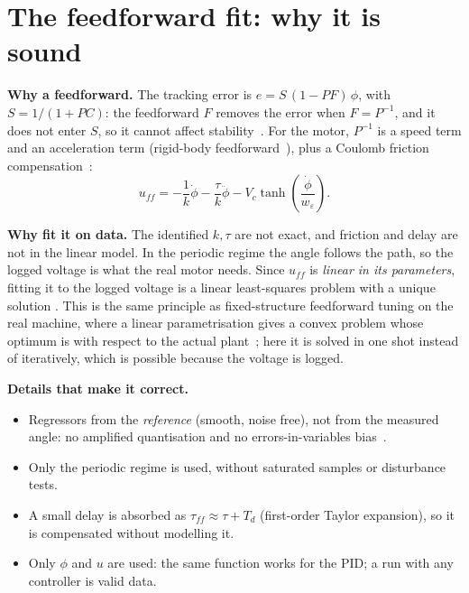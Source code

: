\documentclass[10pt,a4paper]{article}
\begin{document}
\section{The feedforward fit: why it is sound}

\textbf{Why a feedforward.} The tracking error is $e=S\,(1-PF)\,\phi$, with $S=1/(1+PC)$: the feedforward $F$ removes the error
when $F=P^{-1}$, and it does not enter $S$, so it cannot affect stability~\cite{lambrechts05,boerlage03}. For the motor,
$P^{-1}$ is a speed term and an acceleration term (rigid-body feedforward~\cite{lambrechts05}), plus a Coulomb friction
compensation~\cite{armstrong94}:
\begin{equation}
  u_{ff}=-\frac{1}{k}\dot\phi-\frac{\tau}{k}\ddot\phi-V_c\tanh\!\left(\frac{\dot\phi}{w_\varepsilon}\right).
\end{equation}

\textbf{Why fit it on data.} The identified $k,\tau$ are not exact, and friction and delay are not in the linear model. In the
periodic regime the angle follows the path, so the logged voltage is what the real motor needs. Since $u_{ff}$ is
\emph{linear in its parameters}, fitting it to the logged voltage is a linear least-squares problem with a unique solution
\cite{ljung99}. This is the same principle as fixed-structure feedforward tuning on the real machine, where a linear
parametrisation gives a convex problem whose optimum is with respect to the actual plant~\cite{vandermeulen08}; here it is
solved in one shot instead of iteratively, which is possible because the voltage is logged.

\textbf{Details that make it correct.}
\begin{itemize}
  \item Regressors from the \emph{reference} (smooth, noise free), not from the measured angle: no amplified quantisation and no
        errors-in-variables bias~\cite{soderstrom07}.
  \item Only the periodic regime is used, without saturated samples or disturbance tests.
  \item A small delay is absorbed as $\tau_{ff}\approx\tau+T_d$ (first-order Taylor expansion), so it is compensated without
        modelling it.
  \item Only $\phi$ and $u$ are used: the same function works for the PID; a run with any controller is valid data.
\end{itemize}
\end{document}
